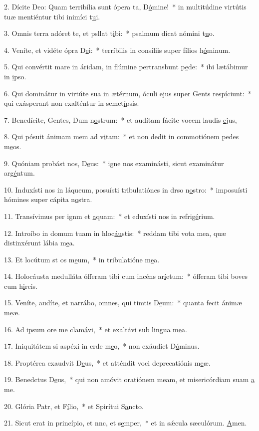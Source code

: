 2. Dícite Deo: Quam terribília sunt ópera ta, D\uline{ó}mine!~* in multitúdine virtútis tuæ mentiéntur tibi inimíci t\uline{u}i.\par 
3. Omnis terra adóret te, et psllat t\uline{i}bi:~* psalmum dicat nómini t\uline{u}o.\par 
4. Veníte, et vidéte ópra D\uline{e}i:~* terríbilis in consíliis super fílios h\uline{ó}minum.\par 
5. Qui convértit mare in áridam, in flúmine pertransbunt p\uline{e}de:~* ibi lætábimur in \uline{i}pso.\par 
6. Qui dominátur in virtúte sua in ætérnum, óculi ejus super Gents resp\uline{í}ciunt:~* qui exásperant non exalténtur in semet\uline{í}psis.\par 
7. Benedícite, Gentes, Dum n\uline{o}strum:~* et audítam fácite vocem laudis \uline{e}jus,\par 
8. Qui pósuit ánimam mem ad v\uline{i}tam:~* et non dedit in commotiónem pedes m\uline{e}os.\par 
9. Quóniam probást nos, D\uline{e}us:~* igne nos examinásti, sicut examinátur arg\uline{é}ntum.\par 
10. Induxísti nos in láqueum, posuísti tribulatiónes in drso n\uline{o}stro:~* imposuísti hómines super cápita n\uline{o}stra.\par 
11. Transívimus per ignm et \uline{a}quam:~* et eduxísti nos in refrig\uline{é}rium.\par 
12. Introíbo in domum tuam in hloc\uline{áu}stis:~* reddam tibi vota mea, quæ distinxérunt lábia m\uline{e}a.\par 
13. Et locútum st os m\uline{e}um,~* in tribulatióne m\uline{e}a.\par 
14. Holocáusta medulláta ófferam tibi cum incéns ar\uline{í}etum:~* ófferam tibi boves cum h\uline{i}rcis.\par 
15. Veníte, audíte, et narrábo, omnes, qui timtis D\uline{e}um:~* quanta fecit ánimæ m\uline{e}æ.\par 
16. Ad ipsum ore me clam\uline{á}vi,~* et exaltávi sub lingua m\uline{e}a.\par 
17. Iniquitátem si aspéxi in crde m\uline{e}o,~* non exáudiet D\uline{ó}minus.\par 
18. Proptérea exaudvit D\uline{e}us,~* et atténdit voci deprecatiónis m\uline{e}æ.\par 
19. Benedctus D\uline{e}us,~* qui non amóvit oratiónem meam, et misericórdiam suam \uline{a} me.\par 
20. Glória Patr, et F\uline{í}lio,~* et Spirítui S\uline{a}ncto.\par 
21. Sicut erat in princípio, et nnc, et s\uline{e}mper,~* et in sǽcula sæculórum. \uline{A}men.\par 
